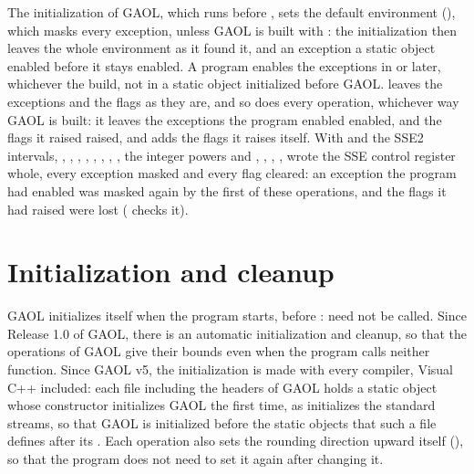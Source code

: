 \medskip
The initialization of GAOL, which runs before , sets the default
environment (), which masks every exception,
unless GAOL is built with : the
initialization then leaves the whole environment as it found it, and an
exception a static object enabled before it stays enabled. A program enables
the exceptions in  or later, whichever the build, not in a
static object initialized before GAOL.  leaves the exceptions
and the flags as they are, and so does every operation, whichever way GAOL is
built: it leaves the exceptions the program enabled enabled, and the flags it
raised raised, and adds the flags it raises itself. With
 and the SSE2 intervals, \code{+}, \code{-},
\code{*}, \code{/}, \code{\%}, , ,
, the integer powers and , ,
, ,  wrote the SSE control register whole,
every exception masked and every flag cleared: an exception the program had
enabled was masked again by the first of these operations, and the flags it
had raised were lost ( checks
it).\newinvfive

\section{Initialization and cleanup}\label{chap:init}
%

GAOL initializes itself when the program starts, before :
 need not be called. Since Release 1.0 of GAOL, there is an
automatic initialization and cleanup, so that the operations of GAOL give their bounds even when the program
calls neither function. Since GAOL v5, the initialization is made with every
compiler, Visual C++ included: each file including the headers of GAOL holds
a static object whose constructor initializes GAOL the first time, as
 initializes the standard streams, so that GAOL is
initialized before the static objects that such a file defines after its
. Each operation also sets the rounding direction upward
itself (), so that the program does not need to set
it again after changing it.\newinvfive

